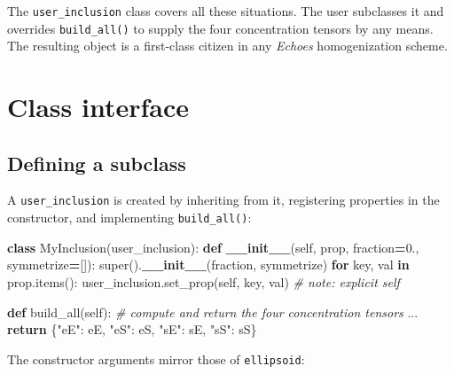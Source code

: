 \documentclass[
  a4paper,
  numbers=noendperiod,
  DIV=12]{scrreprt}
\newenvironment{Shaded}{\begin{snugshade}}{\end{snugshade}}
\newcommand{\BuiltInTok}[1]{#1}
\newcommand{\CommentTok}[1]{\textcolor[rgb]{0.56,0.35,0.01}{\textit{#1}}}
\newcommand{\ControlFlowTok}[1]{\textcolor[rgb]{0.13,0.29,0.53}{\textbf{#1}}}
\newcommand{\FloatTok}[1]{\textcolor[rgb]{0.00,0.00,0.81}{#1}}
\newcommand{\FunctionTok}[1]{\textcolor[rgb]{0.13,0.29,0.53}{\textbf{#1}}}
\newcommand{\KeywordTok}[1]{\textcolor[rgb]{0.13,0.29,0.53}{\textbf{#1}}}
\newcommand{\NormalTok}[1]{#1}
\newcommand{\OperatorTok}[1]{\textcolor[rgb]{0.81,0.36,0.00}{\textbf{#1}}}
\newcommand{\StringTok}[1]{\textcolor[rgb]{0.31,0.60,0.02}{#1}}
\newcommand{\VariableTok}[1]{\textcolor[rgb]{0.00,0.00,0.00}{#1}}
\begin{document}
The \texttt{user\_inclusion} class covers all these situations. The user
subclasses it and overrides \texttt{build\_all()} to supply the four
concentration tensors by any means. The resulting object is a
first-class citizen in any \emph{Echoes} homogenization scheme.

\section{Class interface}\label{sec-user-interface}

\subsection{Defining a subclass}\label{defining-a-subclass}

A \texttt{user\_inclusion} is created by inheriting from it, registering
properties in the constructor, and implementing \texttt{build\_all()}:

\begin{Shaded}
\begin{Highlighting}[]
\KeywordTok{class}\NormalTok{ MyInclusion(user\_inclusion):}
    \KeywordTok{def} \FunctionTok{\_\_init\_\_}\NormalTok{(}\VariableTok{self}\NormalTok{, prop, fraction}\OperatorTok{=}\FloatTok{0.}\NormalTok{, symmetrize}\OperatorTok{=}\NormalTok{[]):}
        \BuiltInTok{super}\NormalTok{().}\FunctionTok{\_\_init\_\_}\NormalTok{(fraction, symmetrize)}
        \ControlFlowTok{for}\NormalTok{ key, val }\KeywordTok{in}\NormalTok{ prop.items():}
\NormalTok{            user\_inclusion.set\_prop(}\VariableTok{self}\NormalTok{, key, val)   }\CommentTok{\# note: explicit self}

    \KeywordTok{def}\NormalTok{ build\_all(}\VariableTok{self}\NormalTok{):}
        \CommentTok{\# compute and return the four concentration tensors}
\NormalTok{        ...}
        \ControlFlowTok{return}\NormalTok{ \{}\StringTok{"eE"}\NormalTok{: eE, }\StringTok{"eS"}\NormalTok{: eS, }\StringTok{"sE"}\NormalTok{: sE, }\StringTok{"sS"}\NormalTok{: sS\}}
\end{Highlighting}
\end{Shaded}

The constructor arguments mirror those of \texttt{ellipsoid}:
\end{document}
